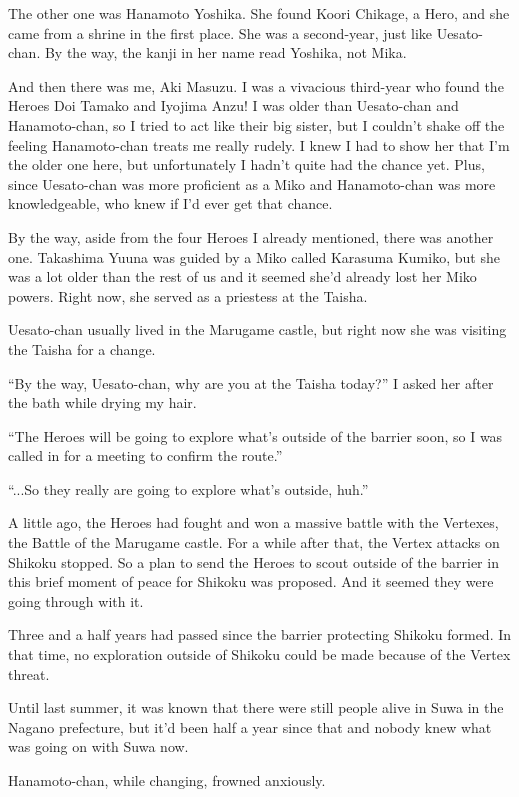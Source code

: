 The other one was Hanamoto Yoshika. She found Koori Chikage, a Hero, and she came from a shrine in the first place. She was a second-year, just like Uesato-chan. By the way, the kanji in her name read Yoshika, not Mika.

And then there was me, Aki Masuzu. I was a vivacious third-year who found the Heroes Doi Tamako and Iyojima Anzu! I was older than Uesato-chan and Hanamoto-chan, so I tried to act like their big sister, but I couldn't shake off the feeling Hanamoto-chan treats me really rudely. I knew I had to show her that I'm the older one here, but unfortunately I hadn't quite had the chance yet. Plus, since Uesato-chan was more proficient as a Miko and Hanamoto-chan was more knowledgeable, who knew if I'd ever get that chance.

By the way, aside from the four Heroes I already mentioned, there was another one. Takashima Yuuna was guided by a Miko called Karasuma Kumiko, but she was a lot older than the rest of us and it seemed she'd already lost her Miko powers. Right now, she served as a priestess at the Taisha.

Uesato-chan usually lived in the Marugame castle, but right now she was visiting the Taisha for a change.

``By the way, Uesato-chan, why are you at the Taisha today?'' I asked her after the bath while drying my hair.

``The Heroes will be going to explore what's outside of the barrier soon, so I was called in for a meeting to confirm the route.''

``...So they really are going to explore what's outside, huh.''

A little ago, the Heroes had fought and won a massive battle with the Vertexes, the Battle of the Marugame castle. For a while after that, the Vertex attacks on Shikoku stopped. So a plan to send the Heroes to scout outside of the barrier in this brief moment of peace for Shikoku was proposed. And it seemed they were going through with it.

Three and a half years had passed since the barrier protecting Shikoku formed. In that time, no exploration outside of Shikoku could be made because of the Vertex threat.

Until last summer, it was known that there were still people alive in Suwa in the Nagano prefecture, but it'd been half a year since that and nobody knew what was going on with Suwa now.

Hanamoto-chan, while changing, frowned anxiously.

